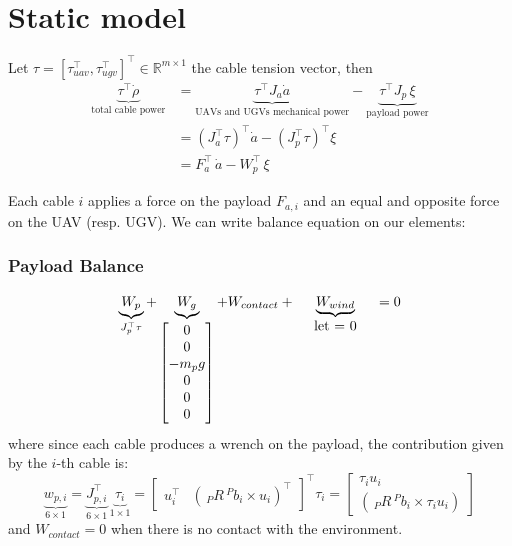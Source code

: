 \section{Static model}
Let $\tau=[\tau_{uav}^\top, \tau_{ugv}^\top]^\top\in \mathbb{R}^{m\times 1}$ the cable tension vector, then
\begin{equation} 
\begin{aligned}
    \underbrace{\tau^\top\dot{\rho}}_{\text{total cable power}} &= \underbrace{\tau^\top J_a\dot{a}}_{\text{UAVs and UGVs mechanical power}} - \underbrace{\tau^\top J_p \, \xi}_{\text{payload power}} \\
    &= (J_a^\top \tau)^\top \dot{a} - (J_p^\top \tau)^\top \xi\\
    &= F_a^\top \, \dot{a} - W_p^\top \, \xi
\end{aligned}
\end{equation}

Each cable $i$ applies a force on the payload $F_{a, i}$ and an equal and opposite force on the UAV (resp. UGV). We can write balance equation on our elements:

\subsubsection{Payload Balance}
\begin{equation}
    \underbrace{W_p}_ {J_p^\top \tau } + \underbrace{W_g}_{\begin{bmatrix}
        0 \\0 \\ - m_p g \\ 0\\ 0\\ 0\\
    \end{bmatrix}} + W_{contact}
 + \underbrace{W_{wind}}_{\parbox{2cm}{\centering let = 0}} = 0
 \label{eq:payloadbalance}
\end{equation}
where since each cable produces a wrench on the payload, the contribution given by the $i$-th cable is:
\begin{equation}
    \underbrace{w_{p,i}}_{6\times 1} = \underbrace{J_{p,i}^\top}_{6\times1} \, \underbrace{\tau_i}_{1\times 1}  = \begin{bmatrix}
        u_i^\top & (\, _P R \, ^P b_i \times u_i )^\top
    \end{bmatrix}^\top \tau_i = \begin{bmatrix}
        \tau_i u_i \\ (\, _P R \, ^P b_i \times \tau_i u_i )
    \end{bmatrix}
\end{equation}
and $W_{contact} = 0$ when there is no contact with the environment.

